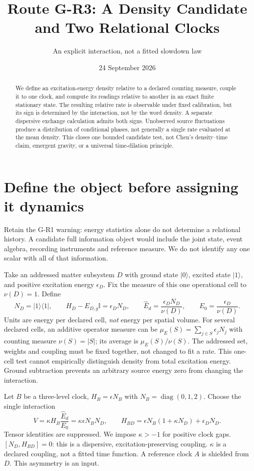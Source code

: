 \documentclass[11pt,a4paper]{article}
\title{Route G-R3: A Density Candidate and Two Relational Clocks}
\author{An explicit interaction, not a fitted slowdown law}
\date{24 September 2026}
\newcommand{\id}{\mathbb I}
\newcommand{\ket}[1]{|#1\rangle}
\newcommand{\bra}[1]{\langle#1|}
\newcommand{\pr}[1]{\ket{#1}\bra{#1}}
\begin{document}
\maketitle
\begin{abstract}
We define an excitation-energy density relative to a declared counting
measure, couple it to one clock, and compute its readings relative to
another in an exact finite stationary state. The resulting relative
rate is observable under fixed calibration, but its sign is determined
by the interaction, not by the word density. A separate dispersive
exchange calculation admits both signs. Unobserved source fluctuations
produce a distribution of conditional phases, not generally a single
rate evaluated at the mean density. This closes one bounded candidate
test, not Chen's density--time claim, emergent gravity, or a universal
time-dilation principle.
\end{abstract}

\section{Define the object before assigning it dynamics}
Retain the G-R1 warning: energy statistics alone do not determine a
relational history. A candidate full information object would include
the joint state, event algebra, recording instruments and reference
measure. We do not identify any one scalar with all of that information.

Take an addressed matter subsystem $D$ with ground state $\ket0$,
excited state $\ket1$, and positive excitation energy $\epsilon_D$.
Fix the measure of this one operational cell to $\nu(D)=1$. Define
\begin{equation}\label{eq:density}
 N_D=\pr1,\qquad H_D-E_{D,g}\id=\epsilon_DN_D,\qquad
 \widehat E_d=\frac{\epsilon_DN_D}{\nu(D)},\qquad
 E_0=\frac{\epsilon_D}{\nu(D)} .
\end{equation}
Units are energy per declared cell, \emph{not} energy per spatial volume.
For several declared cells, an additive operator measure can be
$\mu_E(S)=\sum_{j\in S}\epsilon_jN_j$ with counting measure
$\nu(S)=|S|$; its average is $\mu_E(S)/\nu(S)$. The addressed set,
weights and coupling must be fixed together, not changed to fit a rate.
This one-cell test cannot empirically distinguish density from total
excitation energy. Ground subtraction prevents an arbitrary source
energy zero from changing the interaction.

Let $B$ be a three-level clock, $H_B=\epsilon N_B$ with
$N_B=\operatorname{diag}(0,1,2)$. Choose the single interaction
\begin{equation}\label{eq:interaction}
 V=\kappa H_B\frac{\widehat E_d}{E_0}
   =\kappa\epsilon N_BN_D,\qquad
 H_{BD}=\epsilon N_B(1+\kappa N_D)+\epsilon_DN_D .
\end{equation}
Tensor identities are suppressed. We impose $\kappa>-1$ for positive
clock gaps. $[N_D,H_{BD}]=0$: this is a dispersive, excitation-preserving
coupling. $\kappa$ is a declared coupling, not a fitted time function.
A reference clock $A$ is shielded from $D$. This asymmetry is an input.
\end{document}
